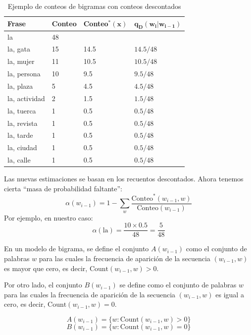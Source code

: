 \documentclass[11pt,fleqn]{book} %
\begin{document}
\begin{table}[h]
    \centering
    \begin{tabular}{|l|l|l|l|}\hline
        \textbf{Frase} & \textbf{Conteo} & \textbf{Conteo}$\mathbf{^*(x)}$ & $\mathbf{q_{\text{D}}(w_i | w_{i-1})}$ \\
        \hline
        la & 48 & & \\
        la, gata & 15 & 14.5 & $14.5/48$ \\
        la, mujer & 11 & 10.5 & $10.5/48$ \\
        la, persona & 10 & 9.5 & $9.5/48$ \\
        la, plaza & 5 & 4.5 & $4.5/48$ \\
        la, actividad & 2 & 1.5 & $1.5/48$ \\
        la, tuerca & 1 & 0.5 & $0.5/48$ \\
        la, revista & 1 & 0.5 & $0.5/48$ \\
        la, tarde & 1 & 0.5 & $0.5/48$ \\
        la, ciudad & 1 & 0.5 & $0.5/48$ \\
        la, calle & 1 & 0.5 & $0.5/48$ \\\hline
    \end{tabular}\caption{Ejemplo de conteos de bigramas con conteos descontados}\label{tab:ej2}
\end{table}

Las nuevas estimaciones se basan en los recuentos descontados. Ahora tenemos cierta ``masa de probabilidad faltante'':
    \[
    \alpha(w_{i-1}) = 1 - \sum_{w} \frac{{\text{{Conteo}}^*(w_{i-1}, w)}}{{\text{{Conteo}}(w_{i-1})}}
    \]
    Por ejemplo, en nuestro caso:
    \[
    \alpha(\text{{la}}) = \frac{{10 \times 0.5}}{{48}} = \frac{{5}}{{48}}
    \]



En un modelo de bigrama, se define el conjunto $A(w_{i-1})$ como el conjunto de palabras $w$ para las cuales la frecuencia de aparición de la secuencia $(w_{i-1}, w)$ es mayor que cero, es decir, $\text{Count}(w_{i-1}, w) > 0$.

Por otro lado, el conjunto $B(w_{i-1})$ se define como el conjunto de palabras $w$ para las cuales la frecuencia de aparición de la secuencia $(w_{i-1}, w)$ es igual a cero, es decir, $\text{Count}(w_{i-1}, w) = 0$.

    \[
    A(w_{i-1}) = \{w : \text{Count}(w_{i-1}, w) > 0\}
    \]
    \[
    B(w_{i-1}) = \{w : \text{Count}(w_{i-1}, w) = 0\}
    \]
\end{document}
